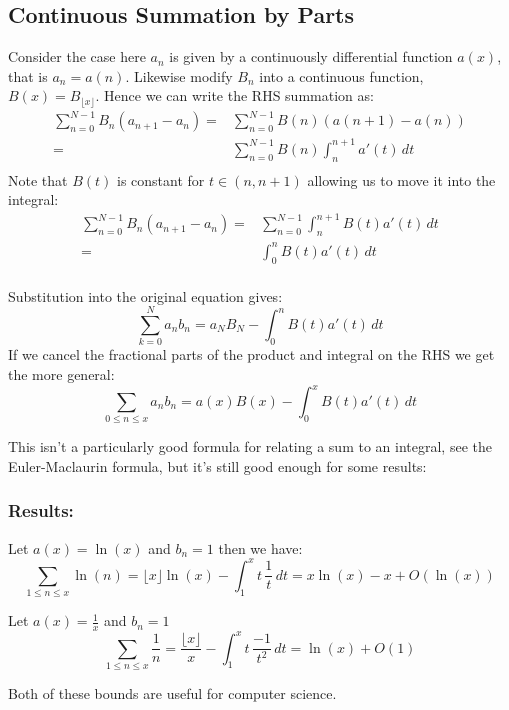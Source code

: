\subsection{Continuous Summation by Parts}
Consider the case here $a_n$ is given by a continuously differential function $a(x)$, 
that is $a_n = a(n)$.
Likewise modify $B_n$ into a continuous function,
$B(x) = B_{\lfloor x \rfloor}$.
Hence we can write the RHS summation as:
\begin{equation*}
\begin{aligned}
	\sum_{n=0}^{N-1}B_n(a_{n+1}-a_n) =& \sum_{n=0}^{N-1}B(n)(a(n+1)-a(n))\\
	=& \sum_{n=0}^{N-1}B(n)\int_n^{n+1}a'(t)\,dt\\
\end{aligned}
\end{equation*}
Note that $B(t)$ is constant for $t\in(n,n+1)$ allowing us to move it into the integral:
\begin{equation*}
\begin{aligned}
	\sum_{n=0}^{N-1}B_n(a_{n+1}-a_n) =& \sum_{n=0}^{N-1}\int_n^{n+1}B(t)a'(t)\,dt\\
	=& \int_0^{n}B(t)a'(t)\,dt\\
\end{aligned}
\end{equation*}

Substitution into the original equation gives:
\[\sum_{k=0}^Na_nb_n = a_NB_N-\int_0^{n}B(t)a'(t)\,dt\]
If we cancel the fractional parts of the product and integral on the RHS we get the more general:
\[\sum_{0\leq n\leq x}a_nb_n = a(x)B(x)-\int_0^{x}B(t)a'(t)\,dt\]

This isn't a particularly good formula for relating a sum to an integral,
see the Euler-Maclaurin formula,
but it's still good enough for some results:

\subsubsection{Results:}
Let $a(x)=\ln(x)$ and $b_n=1$ then we have:
\[\sum_{1\leq n\leq x}\ln(n) = \lfloor x \rfloor \ln(x)-\int_1^xt\,\frac{1}{t}\,dt = x\ln(x) - x +O(\ln(x))\]

Let $a(x)=\frac{1}{x}$ and $b_n =1$
\[\sum_{1\leq n\leq x}\frac{1}{n} = \frac{\lfloor x \rfloor}{x}-\int_1^xt\,\frac{-1}{t^2}\,dt = \ln(x) +O(1)\]

Both of these bounds are useful for computer science. 
